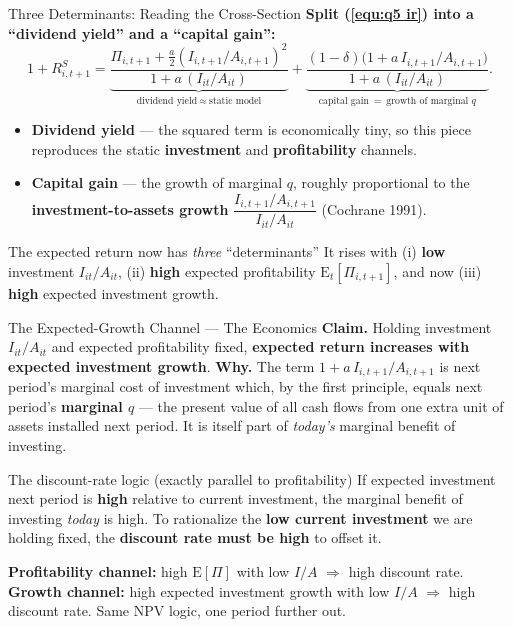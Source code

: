 \documentclass{beamer}
\begin{document}
\begin{frame}{Three Determinants: Reading the Cross-Section}
	\textbf{Split (\ref{equ:q5 ir}) into a ``dividend yield'' and a ``capital gain'':}
	\[
		1+R^S_{i,t+1}=\underbrace{\frac{\Pi_{i,t+1}+\frac{a}{2}(I_{i,t+1}/A_{i,t+1})^{2}}{1+a\,(I_{it}/A_{it})}}_{\text{dividend yield}\ \approx\ \text{static model}}+\underbrace{\frac{(1-\delta)\big(1+a\,I_{i,t+1}/A_{i,t+1}\big)}{1+a\,(I_{it}/A_{it})}}_{\text{capital gain}\ =\ \text{growth of marginal }q}.
	\]
	\begin{itemize}
		\item \textbf{Dividend yield} --- the squared term is economically tiny, so this piece reproduces the static \textbf{investment} and \textbf{profitability} channels.
		\item \textbf{Capital gain} --- the growth of marginal $q$, roughly proportional to the \textbf{investment-to-assets growth} $\dfrac{I_{i,t+1}/A_{i,t+1}}{I_{it}/A_{it}}$ (Cochrane 1991).
	\end{itemize}
	\begin{block}{The expected return now has \emph{three} ``determinants''}
		It rises with (i) \textbf{low} investment $I_{it}/A_{it}$, (ii) \textbf{high} expected profitability $\mathrm{E}_t[\Pi_{i,t+1}]$, and now (iii) \textbf{high} expected investment growth.
	\end{block}
\end{frame}

\begin{frame}{The Expected-Growth Channel --- The Economics}
	\textbf{Claim.} Holding investment $I_{it}/A_{it}$ and expected profitability fixed, \textbf{expected return increases with expected investment growth}.
	\vspace{3pt}
	\textbf{Why.} The term $1+a\,I_{i,t+1}/A_{i,t+1}$ is next period's marginal cost of investment which, by the first principle, equals next period's \textbf{marginal $q$} --- the present value of all cash flows from one extra unit of assets installed next period. It is itself part of \textit{today's} marginal benefit of investing.
	\begin{block}{The discount-rate logic (exactly parallel to profitability)}
		If expected investment next period is \textbf{high} relative to current investment, the marginal benefit of investing \textit{today} is high. To rationalize the \textbf{low current investment} we are holding fixed, the \textbf{discount rate must be high} to offset it.
	\end{block}
	{\footnotesize \textbf{Profitability channel:} high $\mathrm{E}[\Pi]$ with low $I/A$ $\Rightarrow$ high discount rate. \quad \textbf{Growth channel:} high expected investment growth with low $I/A$ $\Rightarrow$ high discount rate. Same NPV logic, one period further out.}
\end{frame}
\end{document}
